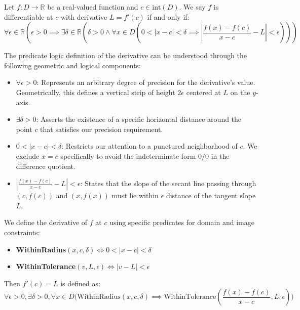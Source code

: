\begin{definition}
Let $f: D \to \mathbb{R}$ be a real-valued function and $c \in \text{int}(D)$. We say $f$ is differentiable at $c$ with derivative $L = f'(c)$ if and only if:
\[
\forall \epsilon \in \mathbb{R} \left( \epsilon > 0 \implies \exists \delta \in \mathbb{R} \left( \delta > 0 \land \forall x \in D \left( 0 < |x - c| < \delta \implies \left| \frac{f(x) - f(c)}{x - c} - L \right| < \epsilon \right) \right) \right)
\]
\end{definition}

\begin{remark}
The predicate logic definition of the derivative can be understood through the following geometric and logical components:
\begin{itemize}
    \item \textbf{$\forall \epsilon > 0$}: Represents an arbitrary degree of precision for the derivative's value. Geometrically, this defines a vertical strip of height $2\epsilon$ centered at $L$ on the $y$-axis.
    \item \textbf{$\exists \delta > 0$}: Asserts the existence of a specific horizontal distance around the point $c$ that satisfies our precision requirement.
    \item \textbf{$0 < |x - c| < \delta$}: Restricts our attention to a punctured neighborhood of $c$. We exclude $x = c$ specifically to avoid the indeterminate form $0/0$ in the difference quotient.
    \item \textbf{$\left| \frac{f(x) - f(c)}{x - c} - L \right| < \epsilon$}: States that the slope of the secant line passing through $(c, f(c))$ and $(x, f(x))$ must lie within $\epsilon$ distance of the tangent slope $L$.
\end{itemize}
\end{remark}

\begin{definition}
We define the derivative of $f$ at $c$ using specific predicates for domain and image constraints:
\begin{itemize}
    \item \textbf{WithinRadius}$(x, c, \delta) \iff 0 < |x - c| < \delta$
    \item \textbf{WithinTolerance}$(v, L, \epsilon) \iff |v - L| < \epsilon$
\end{itemize}
Then $f'(c) = L$ is defined as:
\[
\forall \epsilon > 0, \exists \delta > 0, \forall x \in D \Big( \text{WithinRadius}(x, c, \delta) \implies \text{WithinTolerance}\left( \frac{f(x) - f(c)}{x - c}, L, \epsilon \right) \Big)
\]
\end{definition}

